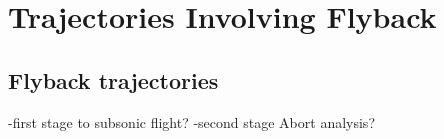 
\cleardoublepage
\chapter{Trajectories Involving Flyback}\label{chapter:numerical}



\section{Flyback trajectories }

-first stage to subsonic flight? 
-second stage
Abort analysis?